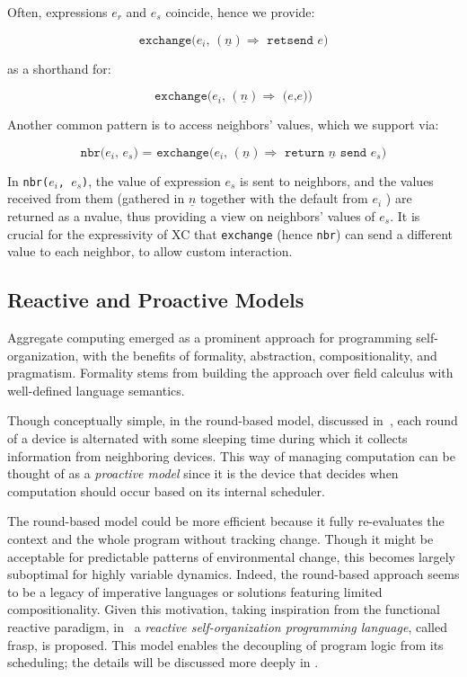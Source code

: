 Often, expressions $e_r$ and $e_s$ coincide, hence we provide:

\[ \texttt{exchange($e_i$, $(\underline{n}) \Rightarrow$ retsend $e$)} \]

as a shorthand for:

\[ \texttt{exchange($e_i$, $(\underline{n}) \Rightarrow$ ($e$,$e$))} \]

Another common pattern is to access neighbors' values, which we support via:

\[ \texttt{nbr($e_i$, $e_s$) = exchange($e_i$, $(\underline{n}) \Rightarrow$ return $\underline{n}$ send $e_s$)} \]

In \texttt{nbr($e_i$, $e_s$)}, the value of expression $e_s$ is sent to neighbors, and the values received from them (gathered in $\underline{n}$ together with the default from $e_i$ ) are returned as a nvalue, thus providing a view on neighbors' values of $e_s$. It is crucial for the expressivity of XC that \texttt{exchange} (hence \texttt{nbr}) can send a different value to each neighbor, to allow custom interaction.

\subsection{Reactive and Proactive Models}
\label{subsection:reactive-and-proactive-models}

Aggregate computing emerged as a prominent approach for programming self-organization, with the benefits of formality, abstraction, compositionality, and pragmatism. Formality stems from building the approach over field calculus with well-defined language semantics.

Though conceptually simple, in the round-based model, discussed in~\cite{Viroli2018}, each round of a device is alternated with some sleeping time during which it collects information from neighboring devices. This way of managing computation can be thought of as a \textit{proactive model} since it is the device that decides when computation should occur based on its internal scheduler.

The round-based model could be more efficient because it fully re-evaluates the context and the whole program without tracking change. Though it might be acceptable for predictable patterns of environmental change, this becomes largely suboptimal for highly variable dynamics. Indeed, the round-based approach seems to be a legacy of imperative languages or solutions featuring limited compositionality. Given this motivation, taking inspiration from the functional reactive paradigm, in~\cite{Casadei2023} a \textit{reactive self-organization programming language}, called \ac{frasp}, is proposed. This model enables the decoupling of program logic from its scheduling; the details will be discussed more deeply in .